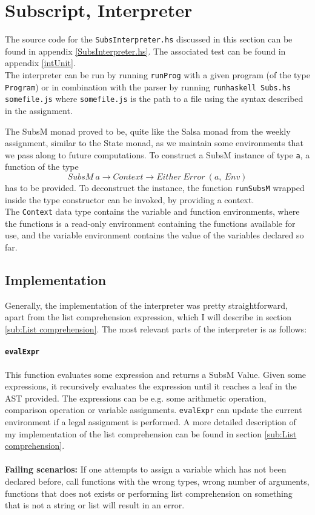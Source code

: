 \documentclass[a4paper]{article}
\begin{document}
\section{Subscript, Interpreter}
The source code for the \texttt{SubsInterpreter.hs} discussed in this section can be found in appendix \ref{SubsInterpreter.hs}. The associated test can be found in appendix \ref{intUnit}.\\

The interpreter can be run by running \texttt{runProg} with a given program (of the type \texttt{Program}) or in combination with the parser by running \texttt{runhaskell Subs.hs somefile.js} where \texttt{somefile.js} is the path to a file using the syntax described in the assignment.

The SubsM monad proved to be, quite like the Salsa monad from the weekly assignment, similar to the State monad, as we maintain some environments that we pass along to future computations. To construct a SubsM instance of type \texttt{a}, a function of the type \[SubsM\: a \rightarrow Context\rightarrow Either\: Error\: (a,\: Env)\] has to be provided. To deconstruct the instance, the function \texttt{runSubsM} wrapped inside the type constructor can be invoked, by providing a context.\\
The \texttt{Context} data type contains the variable and function environments, where the functions is a read-only environment containing the functions available for use, and the variable environment contains the value of the variables declared so far.
\subsection{Implementation}
\label{sub:Implementation}
Generally, the implementation of the interpreter was pretty straightforward, apart from the list comprehension expression, which I will describe in section \ref{sub:List comprehension}. The most relevant parts of the interpreter is as follows:
\paragraph{\texttt{evalExpr}}
\label{par:evalExpr}
This function evaluates some expression and returns a SubsM Value. Given some expressions, it recursively evaluates the expression until it reaches a leaf in the AST provided. The expressions can be e.g. some arithmetic operation, comparison operation or variable assignments. \texttt{evalExpr} can update the current environment if a legal assignment is performed. A more detailed description of my implementation of the list comprehension can be found in section \ref{sub:List comprehension}.\\
\\
\textbf{Failing scenarios:}
If one attempts to assign a variable which has not been declared before, call functions with the wrong types, wrong number of arguments, functions that does not exists or performing list comprehension on something that is not a string or list will result in an error.
\end{document}
